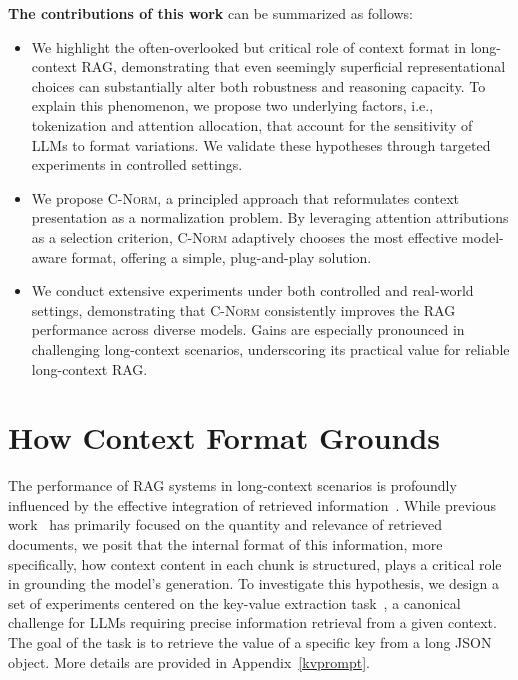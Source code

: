 \documentclass{article} %
\newcommand{\cnorm}{\textsc{C-Norm}}
\begin{document}
\textbf{The contributions of this work} can be summarized as follows:  
\begin{itemize}[leftmargin=*]
    \item We highlight the often-overlooked but critical role of context format in long-context RAG, demonstrating that even seemingly superficial representational choices can substantially alter both robustness and reasoning capacity. To explain this phenomenon, we propose two underlying factors, i.e., tokenization and attention allocation, that account for the sensitivity of LLMs to format variations. We validate these hypotheses through targeted experiments in controlled settings.
    \item We propose \cnorm{}, a principled approach that reformulates context presentation as a normalization problem. By leveraging attention attributions as a selection criterion, \cnorm{} adaptively chooses the most effective model-aware format, offering a simple, plug-and-play solution.
    \item We conduct extensive experiments under both controlled and real-world settings, demonstrating that \cnorm{} consistently improves the RAG performance across diverse models. Gains are especially pronounced in challenging long-context scenarios, underscoring its practical value for reliable long-context RAG.
\end{itemize}



\section{How Context Format Grounds}\label{sec:kv}
The performance of RAG systems in long-context scenarios is profoundly influenced by the effective integration of retrieved information~\citep{borgeaud2022improving, karpukhin2020dense}. While previous work~\citep{DBLP:conf/acl/AsaiSL0I0HY23} has primarily focused on the quantity and relevance of retrieved documents, we posit that the internal format of this information, more specifically, how context content in each chunk is structured, plays a critical role in grounding the model's generation. To investigate this hypothesis, we design a set of experiments centered on the key-value extraction task~\citep{DBLP:journals/tacl/LiuLHPBPL24}, a canonical challenge for LLMs requiring precise information retrieval from a given context.
The goal of the task is to retrieve the value of a specific key from a long JSON object. More details are provided in Appendix~\ref{kvprompt}.
\end{document}
